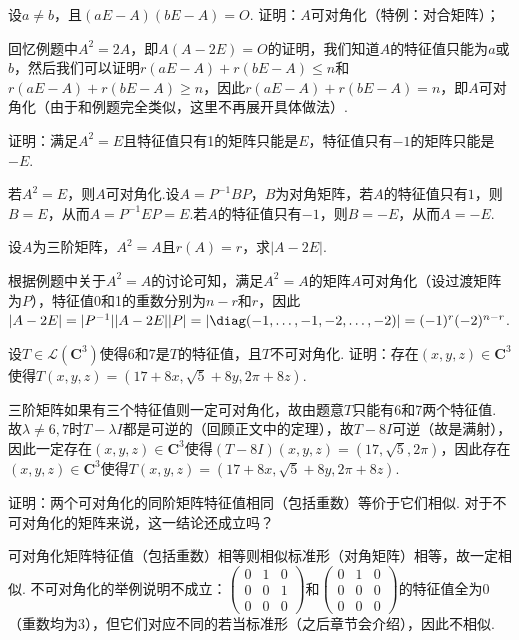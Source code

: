 \begin{exercise}
    \begin{exgroup}
        \item 设$a\neq b$，且$(aE-A)(bE-A)=O$. 证明：$A$可对角化（特例：对合矩阵）；
        \begin{answer}
            回忆例题中$A^2=2A$，即$A(A-2E)=O$的证明，我们知道$A$的特征值只能为$a$或$b$，然后我们可以证明$r(aE-A)+r(bE-A)\leqslant n$和$r(aE-A)+r(bE-A)\geqslant n$，因此$r(aE-A)+r(bE-A)=n$，即$A$可对角化（由于和例题完全类似，这里不再展开具体做法）.
        \end{answer}

        \item 证明：满足$A^2=E$且特征值只有1的矩阵只能是$E$，特征值只有$-1$的矩阵只能是$-E$.
        \begin{answer}
            若$A^2=E$，则$A$可对角化.设$A=P^{-1}BP$，$B$为对角矩阵，若$A$的特征值只有$1$，则$B=E$，从而$A=P^{-1}EP=E$.若$A$的特征值只有$-1$，则$B=-E$，从而$A=-E$.
        \end{answer}

        \item 设$A$为三阶矩阵，$A^2=A$且$r(A)=r$，求$|A-2E|$.
        \begin{answer}
            根据例题中关于$A^2=A$的讨论可知，满足$A^2=A$的矩阵$A$可对角化（设过渡矩阵为$P$），特征值0和1的重数分别为$n-r$和$r$，因此$|A-2E|=|P^{-1}||A-2E||P|=|\diag(-1,\ldots,-1,-2,\ldots,-2)|=(-1)^r(-2)^{n-r}$.
        \end{answer}

        \item 设$T\in \mathcal{L}(\mathbf{C}^3)$使得6和7是$T$的特征值，且$T$不可对角化. 证明：存在$(x,y,z)\in\mathbf{C}^3$使得$T(x,y,z)=(17+8x,\sqrt{5}+8y,2\pi+8z)$.
        \begin{answer}
            三阶矩阵如果有三个特征值则一定可对角化，故由题意$T$只能有6和7两个特征值. 故$\lambda\neq 6,7$时$T-\lambda I$都是可逆的（回顾正文中的定理），故$T-8I$可逆（故是满射），因此一定存在$(x,y,z)\in\mathbf{C}^3$使得$(T-8I)(x,y,z)=(17,\sqrt{5},2\pi)$，因此存在$(x,y,z)\in\mathbf{C}^3$使得$T(x,y,z)=(17+8x,\sqrt{5}+8y,2\pi+8z)$.
        \end{answer}

        \item 证明：两个可对角化的同阶矩阵特征值相同（包括重数）等价于它们相似. 对于不可对角化的矩阵来说，这一结论还成立吗？
        \begin{answer}
            可对角化矩阵特征值（包括重数）相等则相似标准形（对角矩阵）相等，故一定相似. 不可对角化的举例说明不成立：$\begin{pmatrix}
                0 & 1 & 0 \\ 0 & 0 & 1 \\ 0 & 0 & 0
            \end{pmatrix}$和$\begin{pmatrix}
                0 & 1 & 0 \\ 0 & 0 & 0 \\ 0 & 0 & 0
            \end{pmatrix}$的特征值全为0（重数均为3），但它们对应不同的若当标准形（之后章节会介绍），因此不相似.
        \end{answer}


\end{exgroup}
\end{exercise}
